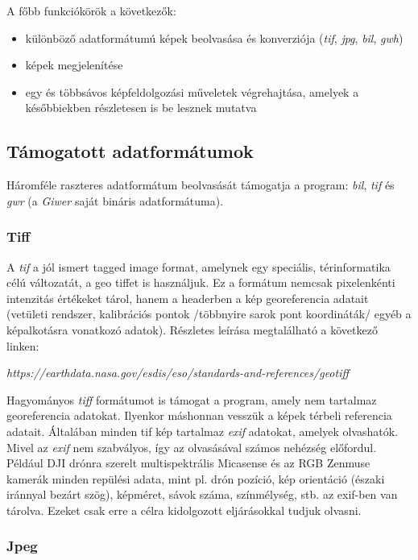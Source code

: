 \documentclass[a4paper,12pt]{article}
\begin{document}
A főbb funkciókörök a következők:

\begin{itemize}
	\item különböző adatformátumú képek beolvasása és konverziója (\textit{tif}, \textit{jpg}, \textit{bil}, \textit{gwh})
	\item képek megjelenítése
	\item egy és többsávos képfeldolgozási műveletek végrehajtása, amelyek a későbbiekben részletesen is be lesznek mutatva
\end{itemize}

\subsection{Támogatott adatformátumok}

Háromféle raszteres adatformátum beolvasását támogatja a program: \textit{bil}, \textit{tif} és \textit{gwr} (a \textit{Giwer} saját bináris adatformátuma). 

\subsubsection{Tiff}
A \textit{tif} a jól ismert tagged image format, amelynek egy speciális, térinformatika célú változatát, a geo tiffet is használjuk. Ez a formátum nemcsak pixelenkénti intenzitás értékeket tárol, hanem a headerben a kép georeferencia adatait (vetületi rendszer, kalibrációs pontok /többnyire sarok pont koordináták/ egyéb a képalkotásra vonatkozó adatok). Részletes leírása megtalálható a következő linken: 

\noindent
\textit{https://earthdata.nasa.gov/esdis/eso/standards-and-references/geotiff}

Hagyományos \textit{tiff} formátumot is támogat a program, amely nem tartalmaz georeferencia adatokat. Ilyenkor máshonnan vesszük a képek térbeli referencia adatait. Általában minden tif kép tartalmaz \textit{exif} adatokat, amelyek olvashatók. Mivel az \textit{exif} nem szabvályos, így az olvasásával számos nehézség előfordul. Például DJI drónra szerelt multispektrális Micasense és az RGB Zenmuse kamerák minden repülési adata, mint pl. drón pozíció, kép orientáció (északi iránnyal bezárt szög), képméret, sávok száma, színmélység, stb. az exif-ben van tárolva. Ezeket csak erre a célra kidolgozott eljárásokkal tudjuk olvasni.


\subsubsection{Jpeg}
\end{document}
